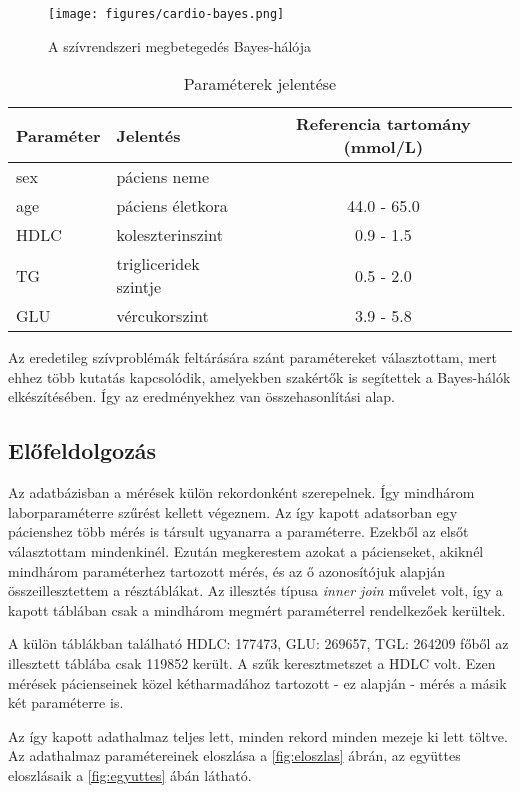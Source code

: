 \begin{figure}
    \centering
    \texttt{[image: figures/cardio-bayes.png]}
    \caption{A szívrendszeri megbetegedés Bayes-hálója}
    \label{fig:cardio-bayes}
\end{figure}

\begin{table}[]
\begin{tabular}{llc}
Paraméter & Jelentés & Referencia tartomány (mmol/L) \\
\hline
sex  & páciens neme &         \\
age  & páciens életkora & 44.0 - 65.0\footnotemark\\
HDLC & koleszterinszint & 0.9 - 1.5     \\
TG   & trigliceridek szintje & 0.5 - 2.0 \\
GLU  & vércukorszint    & 3.9 - 5.8
\end{tabular}
\caption{Paraméterek jelentése}
\label{tab:parameterek_jelentese}
\end{table}

Az eredetileg szívproblémák feltárására szánt paramétereket választottam, mert ehhez több kutatás kapcsolódik, amelyekben szakértők is segítettek a Bayes-hálók elkészítésében. Így az eredményekhez van összehasonlítási alap.

\subsection{Előfeldolgozás}
Az adatbázisban a mérések külön rekordonként szerepelnek. Így mindhárom laborparaméterre szűrést kellett végeznem. Az így kapott adatsorban egy pácienshez több mérés is társult ugyanarra a paraméterre. Ezekből az elsőt választottam mindenkinél. Ezután megkerestem azokat a pácienseket, akiknél mindhárom paraméterhez tartozott mérés, és az ő azonosítójuk alapján összeillesztettem a résztáblákat. Az illesztés típusa \emph{inner join} művelet volt, így a kapott táblában csak a mindhárom megmért paraméterrel rendelkezőek kerültek.

A külön táblákban található HDLC: 177473, GLU: 269657, TGL: 264209 főből az illesztett táblába csak 119852 került. A szűk keresztmetszet a HDLC volt. Ezen mérések pácienseinek közel kétharmadához tartozott - ez alapján - mérés a másik két paraméterre is.

Az így kapott adathalmaz teljes lett, minden rekord minden mezeje ki lett töltve. Az adathalmaz paramétereinek eloszlása a \ref{fig:eloszlas} ábrán, az együttes eloszlásaik a \ref{fig:egyuttes} ábán látható.

